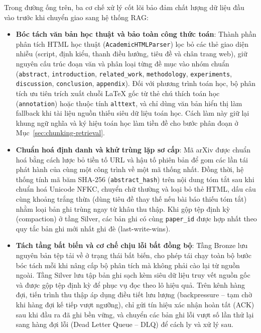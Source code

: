 Trong đường ống trên, ba cơ chế xử lý cốt lõi bảo đảm chất lượng dữ liệu đầu vào trước khi chuyển giao sang hệ thống RAG:

\begin{itemize}
    \item[--] \textbf{Bóc tách văn bản học thuật và bảo toàn công thức toán}: Thành phần phân tích HTML học thuật (\texttt{AcademicHTMLParser}) lọc bỏ các thẻ giao diện nhiễu (script, định kiểu, thanh điều hướng, tiêu đề và chân trang web), giữ nguyên cấu trúc đoạn văn và phân loại từng đề mục vào nhóm chuẩn (\texttt{abstract}, \texttt{introduction}, \texttt{related\_work}, \texttt{methodology}, \texttt{experiments}, \texttt{discussion}, \texttt{conclusion}, \texttt{appendix}). Đối với phương trình toán học, bộ phân tích ưu tiên trích xuất chuỗi LaTeX gốc từ thẻ chú thích toán học (\texttt{annotation}) hoặc thuộc tính \texttt{alttext}, và chỉ dùng văn bản hiển thị làm fallback khi tài liệu nguồn thiếu siêu dữ liệu toán học. Cách làm này giữ lại khung ngữ nghĩa và ký hiệu toán học làm tiền đề cho bước phân đoạn ở Mục~\ref{sec:chunking-retrieval}.
    \item[--] \textbf{Chuẩn hoá định danh và khử trùng lặp sơ cấp}: Mã arXiv được chuẩn hoá bằng cách lược bỏ tiền tố URL và hậu tố phiên bản để gom các lần tái phát hành của cùng một công trình về một mã thống nhất. Đồng thời, hệ thống tính mã băm SHA-256 (\texttt{abstract\_\allowbreak hash}) trên nội dung tóm tắt sau khi chuẩn hoá Unicode NFKC, chuyển chữ thường và loại bỏ thẻ HTML, dấu câu cùng khoảng trắng thừa (dùng tiêu đề thay thế nếu bài báo thiếu tóm tắt) nhằm loại bản ghi trùng ngay từ khâu thu thập. Khi gộp tệp định kỳ (compaction) ở tầng Silver, các bản ghi có cùng \texttt{paper\_id} được hợp nhất theo quy tắc bản ghi mới nhất ghi đè (last-write-wins).
    \item[--] \textbf{Tách tầng bất biến và cơ chế chịu lỗi bất đồng bộ}: Tầng Bronze lưu nguyên bản tệp tải về ở trạng thái bất biến, cho phép tái chạy toàn bộ bước bóc tách mỗi khi nâng cấp bộ phân tích mà không phải cào lại từ nguồn ngoài. Tầng Silver lưu tập bản ghi sạch kèm siêu dữ liệu truy vết nguồn gốc và được gộp tệp định kỳ để phục vụ đọc theo lô hiệu quả. Trên kênh hàng đợi, tiến trình thu thập áp dụng điều tiết lưu lượng (backpressure -- tạm chờ khi hàng đợi kế tiếp vượt ngưỡng), chỉ gửi tín hiệu xác nhận hoàn tất (ACK) sau khi đầu ra đã ghi bền vững, và chuyển các bản ghi lỗi vượt số lần thử lại sang hàng đợi lỗi (Dead Letter Queue -- DLQ) để cách ly và xử lý sau.
\end{itemize}

